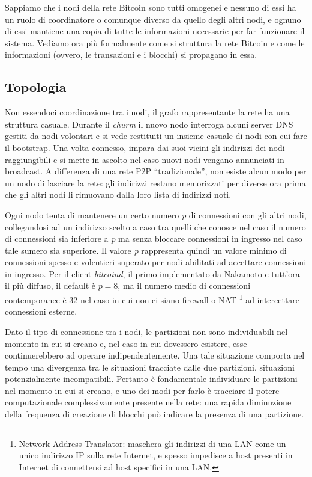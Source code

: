Sappiamo che i nodi della rete Bitcoin sono tutti omogenei e nessuno di essi ha un ruolo di coordinatore o comunque diverso da quello degli altri nodi, e ognuno di essi mantiene una copia di tutte le informazioni necessarie per far funzionare il sistema. Vediamo ora più formalmente come si struttura la rete Bitcoin e come le informazioni (ovvero, le transazioni e i blocchi) si propagano in essa.

\subsection{Topologia}\label{topologia}

Non essendoci coordinazione tra i nodi, il grafo rappresentante la rete ha una struttura casuale. Durante il \emph{churm} il nuovo nodo interroga alcuni server DNS gestiti da nodi volontari e si vede restituiti un insieme casuale di nodi con cui fare il bootstrap. Una volta connesso, impara dai suoi vicini gli indirizzi dei nodi raggiungibili e si mette in ascolto nel caso nuovi nodi vengano annunciati in broadcast. A differenza di una rete P2P ``tradizionale'', non esiste alcun modo per un nodo di lasciare la rete: gli indirizzi restano memorizzati per diverse ora prima che gli altri nodi li rimuovano dalla loro lista di indirizzi noti.

Ogni nodo tenta di mantenere un certo numero \emph{p} di connessioni con gli altri nodi, collegandosi ad un indirizzo scelto a caso tra quelli che conosce nel caso il numero di connessioni sia inferiore a \emph{p} ma senza bloccare connessioni in ingresso nel caso tale sumero sia superiore. Il valore \emph{p} rappresenta quindi un valore minimo di connessioni spesso e volentieri superato per nodi abilitati ad accettare connessioni in ingresso. Per il client \emph{bitcoind}, il primo implementato da Nakamoto e tutt'ora il più diffuso, il default è $p=8$, ma il numero medio di connessioni contemporanee è 32 nel caso in cui non ci siano firewall o NAT \footnote{Network Address Translator: maschera   gli indirizzi di una LAN come un unico indirizzo IP sulla rete   Internet, e spesso impedisce a host presenti in Internet di   connettersi ad host specifici in una LAN.} ad intercettare connessioni esterne.

Dato il tipo di connessione tra i nodi, le partizioni non sono individuabili nel momento in cui si creano e, nel caso in cui dovessero esistere, esse continuerebbero ad operare indipendentemente. Una tale situazione comporta nel tempo una divergenza tra le situazioni tracciate dalle due partizioni, situazioni potenzialmente incompatibili. Pertanto è fondamentale individuare le partizioni nel momento in cui si creano, e uno dei modi per farlo è tracciare il potere computazionale complessivamente presente nella rete: una rapida diminuzione della frequenza di creazione di blocchi può indicare la presenza di una partizione.

